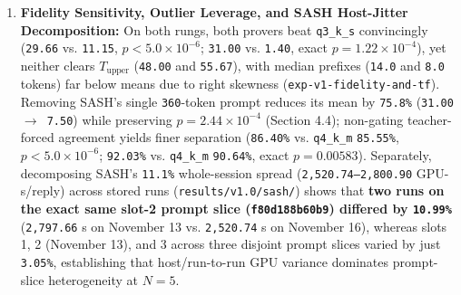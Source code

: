 \documentclass[11pt,letterpaper]{article}
\begin{document}
\begin{enumerate}
\item \textbf{Fidelity Sensitivity, Outlier Leverage, and SASH Host-Jitter Decomposition:} On both rungs, both provers beat \texttt{q3\_\allowbreak{}k\_\allowbreak{}s} convincingly (\texttt{29.66} vs. \texttt{11.15}, $p < 5.0\times 10^{-6}$; \texttt{31.00} vs. \texttt{1.40}, exact $p = 1.22\times 10^{-4}$), yet neither clears $T_{\text{upper}}$ (\texttt{48.00} and \texttt{55.67}), with median prefixes (\texttt{14.0} and \texttt{8.0} tokens) far below means due to right skewness (\texttt{exp-\allowbreak{}v1-\allowbreak{}fidelity-\allowbreak{}and-\allowbreak{}tf}). Removing SASH's single \texttt{360}-token prompt reduces its mean by \texttt{75.8\%} (\texttt{31.00 $\rightarrow$ 7.50}) while preserving $p = 2.44\times 10^{-4}$ (Section 4.4); non-gating teacher-forced agreement yields finer separation (\texttt{86.40\%} vs. \texttt{q4\_\allowbreak{}k\_\allowbreak{}m} \texttt{85.55\%}, $p < 5.0\times 10^{-6}$; \texttt{92.03\%} vs. \texttt{q4\_\allowbreak{}k\_\allowbreak{}m} \texttt{90.64\%}, exact $p = 0.00583$). Separately, decomposing SASH's \texttt{11.1\%} whole-session spread (\texttt{2,520.74--2,800.90} GPU-s/reply) across stored runs (\texttt{results/\allowbreak{}v1.0/\allowbreak{}sash/}) shows that \textbf{two runs on the exact same slot-2 prompt slice (\texttt{f80d188b60b9}) differed by \texttt{10.99\%}} (\texttt{2,797.66} s on November 13 vs. \texttt{2,520.74} s on November 16), whereas slots 1, 2 (November 13), and 3 across three disjoint prompt slices varied by just \texttt{3.05\%}, establishing that host/run-to-run GPU variance dominates prompt-slice heterogeneity at $N = 5$.

\end{enumerate}
\end{document}

